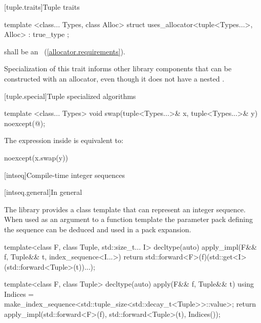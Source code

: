 [tuple.traits]{Tuple traits}

\begin{itemdecl}
template <class... Types, class Alloc>
  struct uses_allocator<tuple<Types...>, Alloc> : true_type { };
\end{itemdecl}

\begin{itemdescr}
\requires {} shall be an ~(\ref{allocator.requirements}).

\pnum
\enternote Specialization of this trait informs other library components that
 can be constructed with an allocator, even though it does not have
a nested . \exitnote
\end{itemdescr}

[tuple.special]{Tuple specialized algorithms}

%
\begin{itemdecl}
template <class... Types>
  void swap(tuple<Types...>& x, tuple<Types...>& y) noexcept(@\seebelow@);
\end{itemdecl}

\begin{itemdescr}
\pnum
\remark The expression inside  is equivalent to:

\begin{codeblock}
noexcept(x.swap(y))
\end{codeblock}

\pnum
\effects {}
\end{itemdescr}

[intseq]{Compile-time integer sequences}

[intseq.general]{In general}

\pnum
The library provides a class template that can represent an integer sequence.
When used as an argument to a function template the parameter pack defining the
sequence can be deduced and used in a pack expansion.

\pnum
\enterexample

\begin{codeblock}
template<class F, class Tuple, std::size_t... I>
  decltype(auto) apply_impl(F&& f, Tuple&& t, index_sequence<I...>) {
    return std::forward<F>(f)(std::get<I>(std::forward<Tuple>(t))...);
  }

template<class F, class Tuple>
  decltype(auto) apply(F&& f, Tuple&& t) {
    using Indices = make_index_sequence<std::tuple_size<std::decay_t<Tuple>>::value>;
    return apply_impl(std::forward<F>(f), std::forward<Tuple>(t), Indices());
  }
\end{codeblock}

